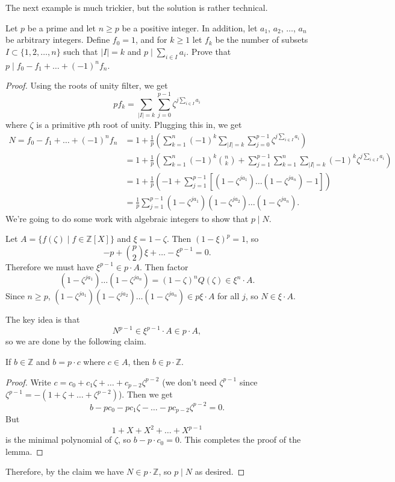 \documentclass{scrartcl}
\begin{document}
The next example is much trickier, but the solution is rather technical. 

\begin{example}[St. Petersburg 2003]
	Let $p$ be a prime and let $n\ge p$ be a positive integer. 
	In addition, let $a_1$, $a_2$, $\dots$, $a_n$ be arbitrary integers. 
	Define $f_0=1$, and for $k\ge 1$ let $f_k$ be the number of subsets 
	$I\subset \{1, 2, \dots, n\}$ such that $|I|=k$ and $p\mid \sum_{i\in I} a_i$. 
	Prove that $p\mid f_0-f_1+\dots+(-1)^nf_n$.
\end{example}

\begin{proof}
	Using the roots of unity filter, we get 
	$$pf_k=\sum_{|I|=k}\sum_{j=0}^{p-1}\zeta^{j \sum_{i\in I} a_i}$$
	where $\zeta$ is a primitive $p$th root of unity.
	Plugging this in, we get
	\begin{align*}
	N = f_0-f_1+\dots+(-1)^nf_n &= 
	1+\frac{1}{p}\left(\sum_{k=1}^n (-1)^k \sum_{|I|=k}\sum_{j=0}^{p-1} \zeta^{j\sum_{i\in I}a_i}\right) \\
	&= 1+\frac{1}{p}\left(\sum_{k=1}^n (-1)^k\binom{n}{k}+
	\sum_{j=1}^{p-1}\sum_{k=1}^n\sum_{|I|=k} (-1)^k\zeta^{j\sum_{i\in I}a_i}\right) \\
	&= 1+\frac{1}{p}\left(-1+\sum_{j=1}^{p-1} \left[(1-\zeta^{ja_1})\dots(1-\zeta^{ja_n})-1\right] \right) \\
	&= \frac{1}{p} \sum_{j=1}^{p-1}(1-\zeta^{ja_1})(1-\zeta^{ja_2})\dots(1-\zeta^{ja_n}).
	\end{align*}
	We're going to do some work with algebraic integers to show that $p\mid N$. 
	
	Let $A=\{f(\zeta)\mid f\in \mathbb{Z}[X]\}$ and $\xi=1-\zeta$.
	Then $(1-\xi)^p=1$, so 
	$$-p+\binom{p}{2}\xi+\dots-\xi^{p-1}=0.$$ 
	Therefore we must have $\xi^{p-1}\in p\cdot A$.
	Then factor 
	$$(1-\zeta^{ja_1})\dots (1-\zeta^{ja_n})=(1-\zeta)^n Q(\zeta)\in \xi^n \cdot A.$$
	Since $n\ge p$, $(1-\zeta^{ja_1})(1-\zeta^{ja_2})\dots(1-\zeta^{ja_n})\in p\xi \cdot A$ 
	for all $j$, so $N\in \xi\cdot A$. 

	The key idea is that $$N^{p-1}\in \xi^{p-1}\cdot A\in p\cdot A,$$ 
	so we are done by the following claim.

	\begin{claim*}
		If $b\in \mathbb{Z}$ and $b=p\cdot c$ where $c\in A$, 
    		then $b\in p\cdot \mathbb{Z}$.
	\end{claim*}
	\begin{proof}
		Write $c=c_0+c_1\zeta+\dots+c_{p-2}\zeta^{p-2}$ (we don't need 
		$\zeta^{p-1}$ since $\zeta^{p-1}=-(1+\zeta+\dots+\zeta^{p-2})$). 
		Then we get $$b-pc_0-pc_1\zeta-\dots-pc_{p-2}\zeta^{p-2}=0.$$ But 
		$$1+X+X^2+\dots+X^{p-1}$$ is the minimal polynomial of $\zeta$, so 
		$b-p\cdot c_0=0$. This completes the proof of the lemma. 
	\end{proof}

	Therefore, by the claim we have $N\in p\cdot \mathbb{Z}$, so $p\mid N$ as desired. 
\end{proof}
\end{document}
